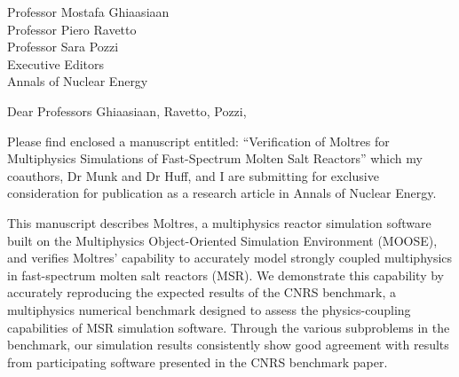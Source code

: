 \documentclass[11pt]{letter} %
\begin{document}


\begin{letter}{Professor Mostafa Ghiaasiaan\\
Professor Piero Ravetto\\
Professor Sara Pozzi\\
Executive Editors\\
Annals of Nuclear Energy}


\address{Sun Myung Park\\
University of Illinois\\
226 Talbot Laboratory\\
MC-234\\
104 S. Wright Street\\
Urbana, IL 61801}




\opening{Dear Professors Ghiaasiaan, Ravetto, Pozzi,}

Please find enclosed a manuscript entitled: ``Verification of Moltres for
Multiphysics Simulations of Fast-Spectrum Molten Salt Reactors'' which my
coauthors, Dr Munk and Dr Huff, and I are submitting for exclusive
consideration for publication as a research article in Annals of Nuclear
Energy.

This manuscript describes Moltres, a multiphysics reactor simulation software
built on the Multiphysics Object-Oriented Simulation Environment (MOOSE), and
verifies Moltres' capability to accurately model strongly coupled multiphysics
in fast-spectrum molten salt reactors (MSR). We demonstrate this capability by
accurately reproducing the expected results of the CNRS benchmark, a
multiphysics numerical benchmark designed to assess the physics-coupling
capabilities of MSR simulation software. Through the various subproblems in the
benchmark, our simulation results consistently show good agreement with
results from participating software presented in the CNRS benchmark
paper.


\end{letter}
\end{document}
